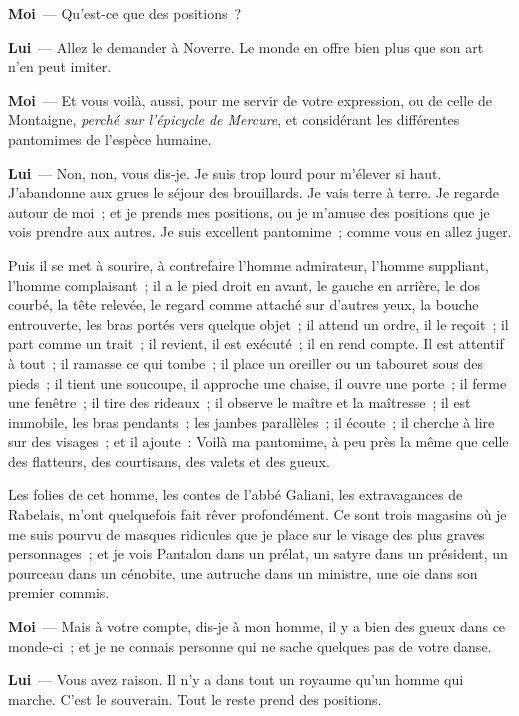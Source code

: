 \documentclass[french,twoside]{book} %
\newcommand{\labelchar}[1]{\textbf{\color{rubric} #1}}
\begin{document}
\labelchar{Moi} — Qu’est-ce que des positions ?\par
\labelchar{Lui} — Allez le demander à Noverre. Le monde en offre bien plus que son art n’en peut imiter.\par
\labelchar{Moi} — Et vous voilà, aussi, pour me servir de votre expression, ou de celle de Montaigne, \emph{perché sur l’épicycle de Mercure}, et considérant les différentes pantomimes de l’espèce humaine.\par
\labelchar{Lui} — Non, non, vous dis-je. Je suis trop lourd pour m’élever si haut. J’abandonne aux grues le séjour des brouillards. Je vais terre à terre. Je regarde autour de moi ; et je prends mes positions, ou je m’amuse des positions que je vois prendre aux autres. Je suis excellent pantomime ; comme vous en allez juger.\par
Puis il se met à sourire, à contrefaire l’homme admirateur, l’homme suppliant, l’homme complaisant ; il a le pied droit en avant, le gauche en arrière, le dos courbé, la tête relevée, le regard comme attaché sur d’autres yeux, la bouche entrouverte, les bras portés vers quelque objet ; il attend un ordre, il le reçoit ; il part comme un trait ; il revient, il est exécuté ; il en rend compte. Il est attentif à tout ; il ramasse ce qui tombe ; il place un oreiller ou un tabouret sous des pieds ; il tient une soucoupe, il approche une chaise, il ouvre une porte ; il ferme une fenêtre ; il tire des rideaux ; il observe le maître et la maîtresse ; il est immobile, les bras pendants ; les jambes parallèles ; il écoute ; il cherche à lire sur des visages ; et il ajoute : Voilà ma pantomime, à peu près la même que celle des flatteurs, des courtisans, des valets et des gueux.\par
Les folies de cet homme, les contes de l’abbé Galiani, les extravagances de Rabelais, m’ont quelquefois fait rêver profondément. Ce sont trois magasins où je me suis pourvu de masques ridicules que je place sur le visage des plus graves personnages ; et je vois Pantalon dans un prélat, un satyre dans un président, un pourceau dans un cénobite, une autruche dans un ministre, une oie dans son premier commis.\par
\labelchar{Moi} — Mais à votre compte, dis-je à mon homme, il y a bien des gueux dans ce monde-ci ; et je ne connais personne qui ne sache quelques pas de votre danse.\par
\labelchar{Lui} — Vous avez raison. Il n’y a dans tout un royaume qu’un homme qui marche. C’est le souverain. Tout le reste prend des positions.\par
\end{document}

